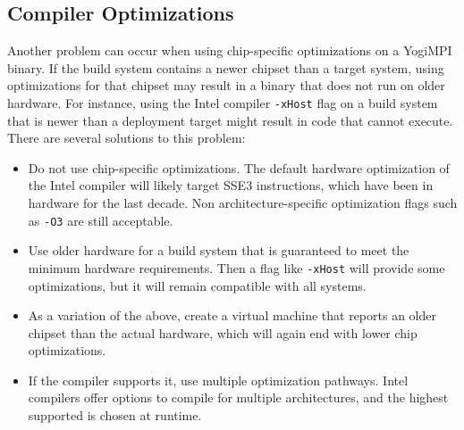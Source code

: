 \documentclass{article}
\begin{document}
\subsection{Compiler Optimizations}
Another problem can occur when using chip-specific optimizations on a YogiMPI binary.  If the build system contains a newer chipset than a target system, using optimizations for that chipset may result in a binary that does not run on older hardware.  For instance, using the Intel compiler \texttt{-xHost} flag on a build system that is newer than a deployment target might result in code that cannot execute.
There are several solutions to this problem:
\begin{itemize}
\item Do not use chip-specific optimizations.  The default hardware optimization of the Intel compiler will likely target SSE3 instructions, which have been in hardware for the last decade. Non architecture-specific optimization flags such as \texttt{-O3} are still acceptable.
\item Use older hardware for a build system that is guaranteed to meet the minimum hardware requirements. Then a flag like \texttt{-xHost} will provide some optimizations, but it will remain compatible with all systems.
\item As a variation of the above, create a virtual machine that reports an older chipset than the actual hardware, which will again end with lower chip optimizations.
\item If the compiler supports it, use multiple optimization pathways. Intel compilers offer options to compile for multiple architectures, and the highest supported is chosen at runtime.
\end{itemize}
\end{document}

